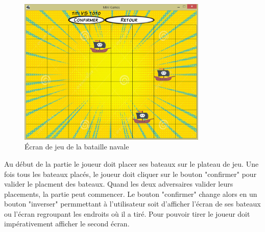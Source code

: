 \documentclass{report}
\begin{document}
\begin{figure}[H]
	\centering\includegraphics[width=9cm]{notreBataille}
	\caption{Écran de jeu de la bataille navale}
    \label{notreBataille}
\end{figure}

Au début de la partie le joueur doit placer ses bateaux sur le plateau de jeu. Une fois
tous les bateaux placés, le joueur doit cliquer sur le bouton "confirmer" pour valider le placment des bateaux.
Quand les deux adversaires valider leurs placements, la partie peut commencer. Le bouton "confirmer" change alors en un
bouton "inverser" permmettant à l'utilisateur soit d'afficher l'écran de ses bateaux ou l'écran regroupant les endroits où il a tiré. Pour pouvoir tirer le joueur doit impérativement afficher le second écran.
\end{document}

